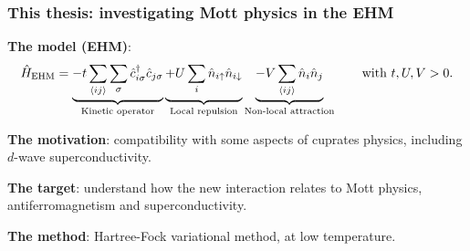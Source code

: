 \begin{frame}
	\frametitle{This thesis: investigating Mott physics in the EHM}
	\textbf{The model (EHM)}:
	\begin{equation*}
		\hat H_\mathrm{EHM} = 
		\underbrace{
			-t \sum_{\langle ij \rangle} \sum_\sigma \hat c_{i\sigma}^\dagger \hat c_{j\sigma}
		}_\text{Kinetic operator}
		\underbrace{
			+
			\vphantom{\sum_{\langle ij \rangle}}
			U \sum_i \hat n_{i\uparrow} \hat n_{i\downarrow}
		}_\text{Local repulsion} 
		\underbrace{
			-V \sum_{\langle ij \rangle} \hat n_i \hat n_j
		}_\text{Non-local attraction}
		\qquad
		\text{with $t,U,V>0$.}
	\end{equation*}

	\vspace{1em}

	\textbf{The motivation}: compatibility with some aspects of cuprates physics, including $d$-wave superconductivity.
	
	\vspace{1em}
	
	\textbf{The target}: understand how the new interaction relates to Mott physics, antiferromagnetism and superconductivity.
	
	\vspace{1em}
	
	\textbf{The method}: Hartree-Fock variational method, at low temperature.
	
\end{frame}